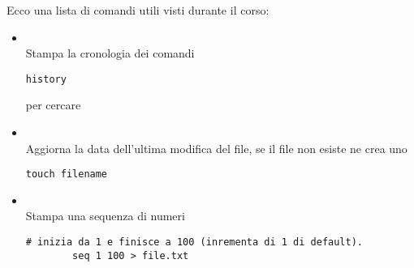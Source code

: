 \documentclass[../main.tex]{subfiles}
\begin{document}
Ecco una lista di comandi utili visti durante il corso:
\begin{itemize}
    \item {} \\
    Stampa la cronologia dei comandi
    \begin{lstlisting}[style=bash]
        history
    \end{lstlisting}
     per cercare
    \item {} \\
    Aggiorna la data dell'ultima modifica del file, se il file non esiste ne crea uno
    \begin{lstlisting}[style=bash]
        touch filename
    \end{lstlisting}
    \item {} \\
    Stampa una sequenza di numeri
    \begin{lstlisting}[style=bash]
        # inizia da 1 e finisce a 100 (inrementa di 1 di default).
        seq 1 100 > file.txt


\end{lstlisting}
\end{itemize}
\end{document}
